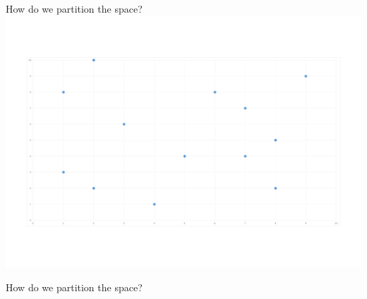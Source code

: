 \documentclass[11 pt]{beamer}
\begin{document}
\begin{frame}{How do we partition the space?}
  \centering
  \includegraphics[width=.7\textwidth]{figures/Base.png}
\end{frame}
\begin{frame}{How do we partition the space?}
  \centering

\end{frame}
\end{document}
